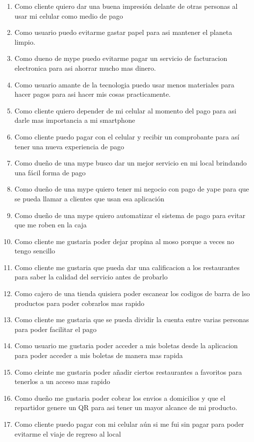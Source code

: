 \documentclass{article}
\begin{document}
\begin{enumerate}
    \item Como cliente quiero dar una buena impresión delante de otras personas al usar mi celular como medio de pago
    \item Como usuario puedo evitarme gastar papel para asi mantener el planeta limpio.
    \item Como dueno de mype puedo evitarme pagar un servicio de facturacion electronica para asi ahorrar mucho mas dinero.
    \item Como usuario amante de la tecnologia puedo usar menos materiales para hacer pagos para asi hacer mis cosas practicamente.
    \item Como cliente quiero depender de mi celular al momento del pago para asi darle mas importancia a mi smartphone
    \item Como cliente puedo pagar con el celular y recibir un comprobante para así tener una nueva experiencia de pago
    \item Como dueño de una mype busco dar un mejor servicio en mi local brindando una fácil forma de pago
    \item Como dueño de una mype quiero tener mi negocio con pago de yape para que se pueda llamar a clientes que usan esa aplicación
    \item Como dueño de una mype quiero automatizar el sistema de pago para evitar que me roben en la caja
    \item Como cliente me gustaria poder dejar propina al moso porque a veces no tengo sencillo
    
    \item Como cliente me gustaria que pueda dar una calificacion a los restaurantes para saber la calidad del servicio antes de probarlo
    \item Como cajero de una tienda quisiera poder escanear los codigos de barra de lso productos para poder cobrarlos mas rapido
    \item Como cliente me gustaria que se pueda dividir la cuenta entre varias personas para poder facilitar el pago
    \item Como usuario me gustaria poder acceder a mis boletas desde la aplicacion para poder acceder a mis boletas de manera mas rapida
    \item Como cleinte me gustaria poder añadir ciertos restaurantes a favoritos para tenerlos a un acceso mas rapido
    \item Como dueño me gustaria poder cobrar los envios a domicilios y que el repartidor genere un QR para asi tener un mayor alcance de mi producto.
    \item Como cliente puedo pagar con mi celular aún si me fui sin pagar para poder evitarme el viaje de regreso al local
    
    
\end{enumerate}
\end{document}
